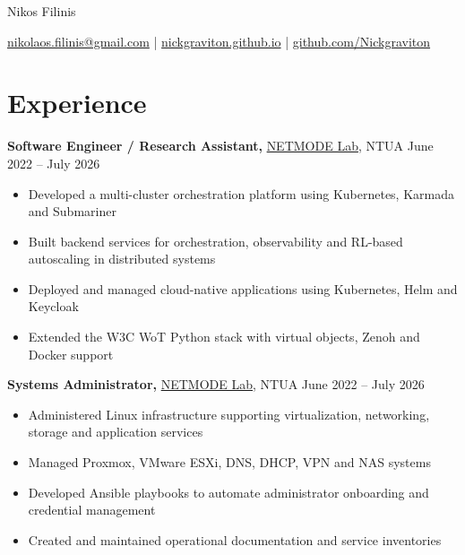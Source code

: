 \documentclass[11pt]{article}       %
\begin{document}
\centerline{\Huge Nikos Filinis}

\vspace{5pt}

\centerline{\href{mailto:nikolaos.filinis@gmail.com}{nikolaos.filinis@gmail.com} | \href{https://nickgraviton.github.io/}{nickgraviton.github.io} | \href{https://github.com/Nickgraviton}{github.com/Nickgraviton}}

\vspace{-10pt}

\section*{Experience}

\textbf{Software Engineer / Research Assistant,} \href{https://www.netmode.ntua.gr/}{NETMODE Lab}, NTUA \hfill June 2022 -- July 2026 \\
\vspace{-9pt}
\begin{itemize}
  \item Developed a multi-cluster orchestration platform using Kubernetes, Karmada and Submariner
  \item Built backend services for orchestration, observability and RL-based autoscaling in distributed systems
  \item Deployed and managed cloud-native applications using Kubernetes, Helm and Keycloak
  \item Extended the W3C WoT Python stack with virtual objects, Zenoh and Docker support
\end{itemize}

\textbf{Systems Administrator,} \href{https://www.netmode.ntua.gr/}{NETMODE Lab}, NTUA \hfill June 2022 -- July 2026 \\
\vspace{-9pt}
\begin{itemize}
  \item Administered Linux infrastructure supporting virtualization, networking, storage and application services
  \item Managed Proxmox, VMware ESXi, DNS, DHCP, VPN and NAS systems
  \item Developed Ansible playbooks to automate administrator onboarding and credential management
  \item Created and maintained operational documentation and service inventories
\end{itemize}
\end{document}
